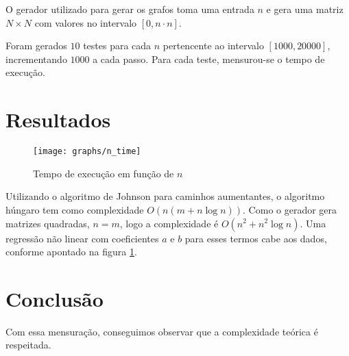 \documentclass[11pt]{article}
\begin{document}
O gerador utilizado para gerar os grafos toma uma entrada $n$ e gera uma matriz $N \times N$ com valores no intervalo $[0, n \cdot n]$.

Foram gerados $10$ testes para cada $n$ pertencente ao intervalo $[1000, 20000]$, incrementando $1000$ a cada passo. Para cada teste, mensurou-se o tempo de execução.

\section{Resultados}

\begin{figure}[H]
    \centering
    \caption{Tempo de execução em função de $n$}
    \label{fig:n_time}
    \texttt{[image: graphs/n\_time]}
\end{figure}

Utilizando o algoritmo de Johnson para caminhos aumentantes, o algoritmo húngaro tem como complexidade $O(n(m+n \log n))$.
Como o gerador gera matrizes quadradas, $n = m$, logo a complexidade é $O(n^2 + n^2 \log n)$.
Uma regressão não linear com coeficientes $a$ e $b$ para esses termos cabe aos dados, conforme apontado na figura \ref{fig:n_time}.

\section{Conclusão}

Com essa mensuração, conseguimos observar que a complexidade teórica é respeitada.
\end{document}
